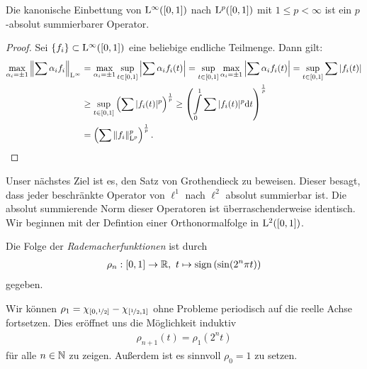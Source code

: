 \begin{sz}
	Die kanonische Einbettung von $ \mathrm{L}^\infty([0,1]) $ nach $ \mathrm{L}^p([0,1]) $ mit $ 1 \leq p < \infty $ ist ein $ p $-absolut summierbarer Operator.
\end{sz}

\begin{proof}
	Sei $ \{f_i\} \subset \mathrm{L}^\infty([0,1]) $ eine beliebige endliche Teilmenge.
	Dann gilt:
	\begin{align*}
		\max\limits_{\alpha_i = \pm 1}
		\left\|
		\sum \alpha_i f_i
		\right\|_{\mathrm{L}^\infty}
		&=
		\max\limits_{\alpha_i = \pm 1}
		\sup \limits_{t \in [0,1]}
		\left|
		\sum \alpha_i f_i(t)
		\right|
		=
		\sup \limits_{t \in [0,1]}
		\max\limits_{\alpha_i = \pm 1}
		\left|
		\sum \alpha_i f_i(t)
		\right|
		=
		\sup \limits_{t \in [0,1]}
		\sum | f_i(t) |\\
		&\geq 
		\sup \limits_{t \in [0,1]}
		\left(
		\sum |f_i(t)|^p 
		\right)^\frac{1}{p}
		\geq 
		\left(
		\int \limits_0^1
		\sum |f_i(t)|^p \mathrm{d}t
		\right)^\frac{1}{p}\\
		&=
		\left(
		\sum \|f_i\|^p_{\mathrm{L}^p} 
		\right)^\frac{1}{p}.
	\end{align*}
\end{proof}

Unser nächstes Ziel ist es, den Satz von Grothendieck zu beweisen.
Dieser besagt, dass jeder beschränkte Operator von $ \ell^1 $ nach $ \ell^2 $ absolut summierbar ist.
Die absolut summierende Norm dieser Operatoren ist überraschenderweise identisch. Wir beginnen mit der Defintion einer Orthonormalfolge in $ \mathrm{L}^2([0,1]) $.

\begin{df}
	Die Folge der \textit{Rademacherfunktionen} ist durch
	\begin{align*}
		\rho_n : [0,1] \to \mathbb{R}, \  t \mapsto \mathrm{sign} \left(\sin (2^n \pi t)\right)
	\end{align*}
	gegeben. 
\end{df}

Wir können $ \rho_1 = \chi_{[0,\nicefrac{1}{2}]} - \chi_{[\nicefrac{1}{2},1]}  $ ohne Probleme periodisch auf die reelle Achse fortsetzen. Dies eröffnet uns die Möglichkeit induktiv
\begin{align*}
	\rho_{n+1}(t) = \rho_1(2^n t)
\end{align*}
für alle $ n \in \mathbb{N} $ zu zeigen. 
Außerdem ist es sinnvoll $ \rho_0 = 1 $ zu setzen. 

